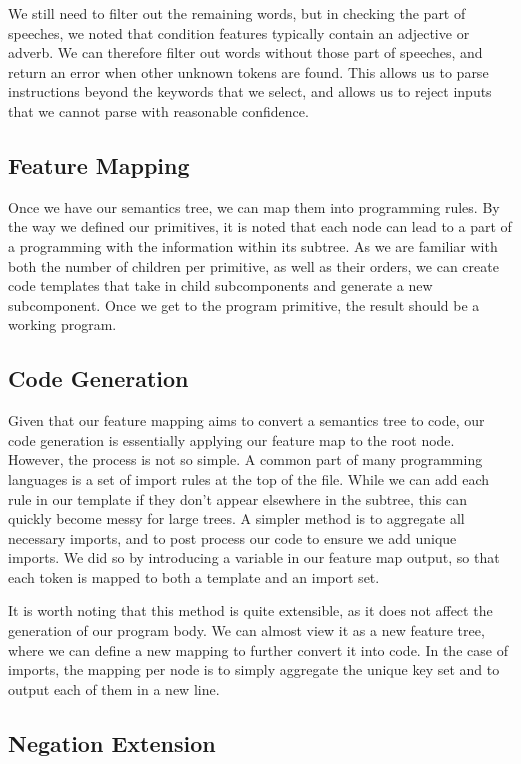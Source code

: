 \documentclass[11pt,letterpaper]{article}
\begin{document}
We still need to filter out the remaining words, but in checking the part of speeches, we noted that condition features typically contain an adjective or adverb.
We can therefore filter out words without those part of speeches, and return an error when other unknown tokens are found.
This allows us to parse instructions beyond the keywords that we select, and allows us to reject inputs that we cannot parse with reasonable confidence.

\subsection{Feature Mapping}

Once we have our semantics tree, we can map them into programming rules.
By the way we defined our primitives, it is noted that each node can lead to a part of a programming with the information within its subtree.
As we are familiar with both the number of children per primitive, as well as their orders, we can create code templates that take in child subcomponents and generate a new subcomponent.
Once we get to the program primitive, the result should be a working program.

\subsection{Code Generation}

Given that our feature mapping aims to convert a semantics tree to code, our code generation is essentially applying our feature map to the root node.
However, the process is not so simple.
A common part of many programming languages is a set of import rules at the top of the file.
While we can add each rule in our template if they don't appear elsewhere in the subtree, this can quickly become messy for large trees.
A simpler method is to aggregate all necessary imports, and to post process our code to ensure we add unique imports.
We did so by introducing a variable in our feature map output, so that each token is mapped to both a template and an import set.

It is worth noting that this method is quite extensible, as it does not affect the generation of our program body.
We can almost view it as a new feature tree, where we can define a new mapping to further convert it into code.
In the case of imports, the mapping per node is to simply aggregate the unique key set and to output each of them in a new line.

\subsection{Negation Extension}
\end{document}
